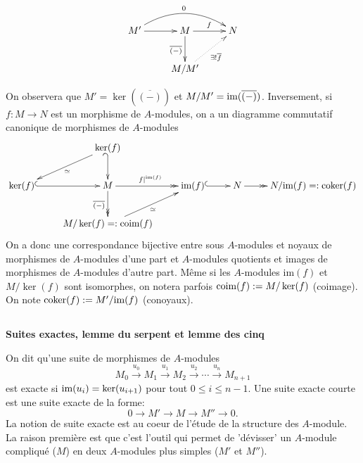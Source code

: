 \documentclass[a4paper, oneside, 12pt]{book}
\theoremstyle{theoremeStyle} %
\theoremstyle{definition} %
\begin{document}
$$\xymatrix{M'\ar[r]\ar@/^1.5pc/[rr]^{0}&M\ar[r]^{f}\ar[d]_{\overline{(-)}}&N\\
&M/M'\ar@{.>}[ur]_{\exists ! \overline{f}}&}$$




 On observera que $M'=\ker(\overline{(-)})$ et $M/M'=\hbox{\rm im}(\overline{(-)})$. Inversement, si $f:M\rightarrow N$ est un morphisme de  $A$-modules, on  a un diagramme commutatif canonique de morphismes de $A$-modules
$$\xymatrix{&\ker(f)\ar@{_{(}->}[d]\ar[dl]^\simeq&&&\\
\ker(f)\ar@{^{(}->}[r]&M\ar@{->>}[d]_{\overline{(-)}}\ar@{->>}[r]^{f|^{\hbox{\rm\tiny im}(f)}}&\hbox{\rm im}(f)\ar@{^{(}->}[r]&N\ar@{->>}[r]&N/\hbox{\rm im}(f)=:\hbox{\rm coker}(f)\\
&M/\ker(f)=:\hbox{\rm coim}(f)\ar[ur]_{\simeq}&&}$$
 On a donc une correspondance bijective entre sous $A$-modules et noyaux de morphismes de $A$-modules d'une part et $A$-modules quotients et images de morphismes de $A$-modules d'autre part. Même si les $A$-modules im$(f)$ et $M/\ker(f)$ sont isomorphes, on notera parfois $\hbox{\rm coim}(f):=M/\ker(f)$ (coimage). On note $\hbox{\rm coker}(f):=M'/\hbox{\rm im}(f)$ (conoyaux). \\

\subsection{}\textbf{Suites exactes, lemme du serpent et lemme des cinq}\label{SuiteExacte}


 On dit qu'une suite de morphismes de $A$-modules
$$M_{0}\stackrel{u_{0}}{\rightarrow} M_{1}\stackrel{u_{1}}{\rightarrow} M_{2}\stackrel{u_{2}}{\rightarrow}   \cdots\stackrel{u_{n}}{\rightarrow} M_{n+1}$$
est exacte si $\hbox{\rm im}(u_{i})=\ker(u_{i+1})$ pour tout $0\leq i\leq n-1$.  Une suite exacte courte est une suite exacte de la forme:
$$0\rightarrow M'\rightarrow M\rightarrow M''\rightarrow 0.$$
La notion de suite exacte est au coeur de l'étude de la structure des $A$-module. La raison première est que c'est l'outil qui permet de 'dévisser' un $A$-module compliqué ($M$) en deux $A$-modules plus simples ($M'$ et $M''$).  \\
\end{document}
